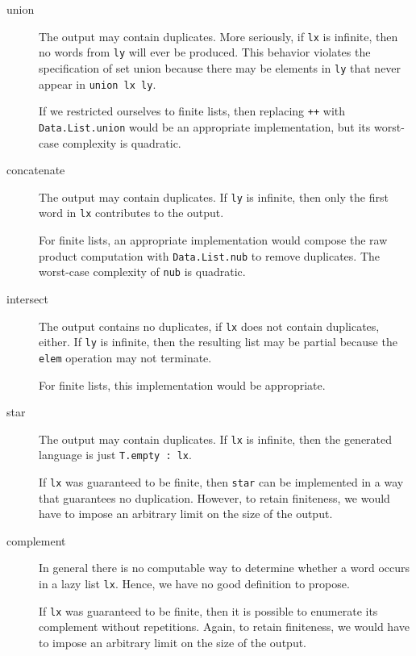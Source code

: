 \begin{description}
\item[union] The output may contain duplicates. More seriously, if
  \texttt{lx} is infinite, then no words from \texttt{ly} will ever be
  produced. This behavior violates the specification of set union
  because there may be elements in \texttt{ly} that never appear in
  \texttt{union lx ly}.

  If we restricted ourselves to finite lists, then replacing
  \texttt{++} with \texttt{Data.List.union} would be an appropriate
  implementation, but its worst-case complexity is quadratic.
\item[concatenate] The output may contain duplicates. If \texttt{ly}
  is infinite, then only the first word in \texttt{lx} contributes to
  the output.

  For finite lists, an appropriate implementation would compose the
  raw product computation with \texttt{Data.List.nub} to remove
  duplicates. The worst-case complexity of \texttt{nub} is quadratic.
\item[intersect] The output contains no duplicates, if \texttt{lx}
  does not contain duplicates, either. If \texttt{ly} is infinite,
  then the resulting list may be partial because the \texttt{elem}
  operation may not terminate.

  For finite lists, this implementation would be appropriate.
\item[star] The output may contain duplicates. If \texttt{lx} is
  infinite, then the generated language is just \texttt{T.empty : lx}.

  If \texttt{lx} was guaranteed to be finite, then \texttt{star} can
  be implemented in a way that guarantees no duplication. However, to
  retain finiteness, we would have to impose an arbitrary limit on the
  size of the output.
\item[complement] In general there is no computable way to determine
  whether a word occurs in a lazy list \texttt{lx}. Hence, we have no
  good definition to propose.

  If \texttt{lx} was guaranteed to be finite, then it is possible to
  enumerate its complement without repetitions. Again, to retain
  finiteness, we would have to impose an arbitrary limit on the size
  of the output.
\end{description}
